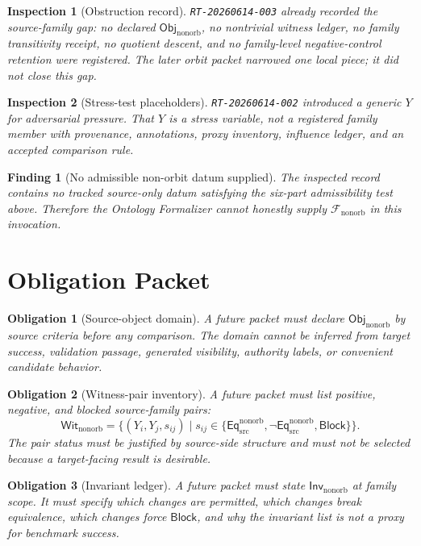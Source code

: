 \documentclass[11pt]{article}
\newcommand{\ObjNon}{\mathsf{Obj}_{\mathrm{nonorb}}}
\newcommand{\FamNon}{\mathcal{F}_{\mathrm{nonorb}}}
\newcommand{\InvNon}{\mathsf{Inv}_{\mathrm{nonorb}}}
\newcommand{\WitNon}{\mathsf{Wit}_{\mathrm{nonorb}}}
\newcommand{\EqNon}{\mathsf{Eq}_{\mathrm{src}}^{\mathrm{nonorb}}}
\newcommand{\Block}{\mathsf{Block}}
\newtheorem{inspection}{Inspection}
\newtheorem{obligation}{Obligation}
\newtheorem{finding}{Finding}
\begin{document}
\begin{inspection}[Obstruction record]
\texttt{RT-20260614-003} already recorded the source-family gap: no
declared \(\ObjNon\), no nontrivial witness ledger, no family transitivity
receipt, no quotient descent, and no family-level negative-control
retention were registered. The later orbit packet narrowed one local
piece; it did not close this gap.
\end{inspection}

\begin{inspection}[Stress-test placeholders]
\texttt{RT-20260614-002} introduced a generic \(Y\) for adversarial
pressure. That \(Y\) is a stress variable, not a registered family member
with provenance, annotations, proxy inventory, influence ledger, and an
accepted comparison rule.
\end{inspection}

\begin{finding}[No admissible non-orbit datum supplied]
The inspected record contains no tracked source-only datum satisfying the
six-part admissibility test above. Therefore the Ontology Formalizer
cannot honestly supply \(\FamNon\) in this invocation.
\end{finding}

\section{Obligation Packet}

\begin{obligation}[Source-object domain]
A future packet must declare \(\ObjNon\) by source criteria before any
comparison. The domain cannot be inferred from target success, validation
passage, generated visibility, authority labels, or convenient candidate
behavior.
\end{obligation}

\begin{obligation}[Witness-pair inventory]
A future packet must list positive, negative, and blocked source-family
pairs:
\[
    \WitNon=\{(Y_i,Y_j,s_{ij})\mid
    s_{ij}\in\{\EqNon,\neg\EqNon,\Block\}\}.
\]
The pair status must be justified by source-side structure and must not
be selected because a target-facing result is desirable.
\end{obligation}

\begin{obligation}[Invariant ledger]
A future packet must state \(\InvNon\) at family scope. It must specify
which changes are permitted, which changes break equivalence, which
changes force \(\Block\), and why the invariant list is not a proxy for
benchmark success.
\end{obligation}
\end{document}
